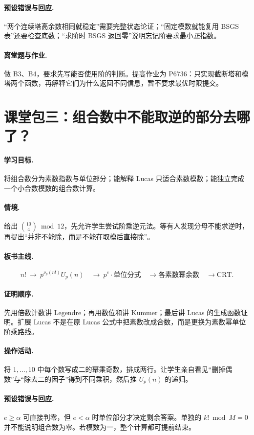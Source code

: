 \paragraph{预设错误与回应.} “两个连续塔高余数相同就稳定”需要完整状态论证；“固定模数就能复用 BSGS 表”还要检查底数；“求阶时 BSGS 返回零”说明忘记阶要求最小\emph{正}指数。
\paragraph{离堂题与作业.} 做 B3、B4，要求先写能否使用阶的判断。提高作业为 P6736：只实现截断塔和模塔两个函数，再解释它们为什么返回不同信息，暂不要求最优时限提交。

\section{课堂包三：组合数中不能取逆的部分去哪了？}
\paragraph{学习目标.} 将组合数分为素数指数与单位部分；能解释 Lucas 只适合素数模数；能独立完成一个小合数模数的组合数计算。
\paragraph{情境.} 给出 $\binom{10}{4}\bmod12$，先允许学生尝试阶乘逆元法。等有人发现分母不能求逆时，再提出“并非不能除，而是不能在取模后直接除”。
\paragraph{板书主线.}
\[
 n!\ \longrightarrow\ p^{\nu_p(n!)}U_p(n)
 \quad\longrightarrow\ p^e\cdot\text{单位分式}
 \quad\longrightarrow\text{各素数幂余数}\quad\longrightarrow\mathrm{CRT}.
\]
\paragraph{证明顺序.} 先用倍数计数讲 Legendre；再用数位和讲 Kummer；最后讲 Lucas 的生成函数证明。扩展 Lucas 不是在原 Lucas 公式中把素数改成合数，而是更换为素数幂单位阶乘路线。
\paragraph{操作活动.} 将 $1,\ldots,10$ 中每个数写成二的幂乘奇数，排成两行。让学生亲自看见“删掉偶数”与“除去二的因子”得到不同乘积，然后推 $U_p(n)$ 的递归。
\paragraph{预设错误与回应.} $e\ge\alpha$ 可直接判零，但 $e<\alpha$ 时单位部分才决定剩余答案。单独的 $k!\bmod M=0$ 并不能说明组合数为零。若模数为一，整个计算都可提前结束。
